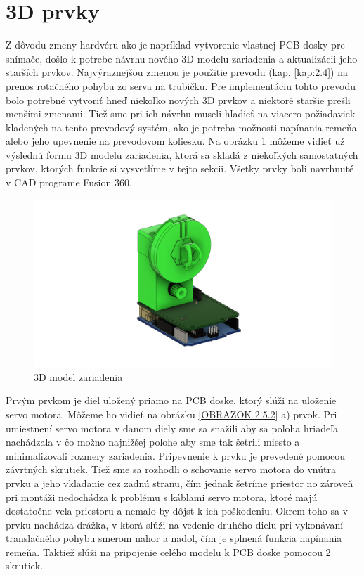 \section{3D prvky}
\label{kap:2.5}


Z dôvodu zmeny hardvéru ako je napríklad vytvorenie vlastnej PCB dosky pre snímače, došlo  k potrebe návrhu nového 3D modelu zariadenia a aktualizácii jeho starších prvkov.  Najvýraznejšou zmenou je použitie prevodu (kap. \ref{kap:2.4}) na prenos rotačného pohybu zo serva na trubičku. Pre implementáciu tohto prevodu bolo potrebné vytvoriť hneď niekoľko nových 3D prvkov a niektoré staršie prešli menšími zmenami. Tiež sme pri ich návrhu museli hľadieť na viacero požiadaviek kladených na tento prevodový systém, ako je potreba možnosti napínania remeňa alebo jeho upevnenie na prevodovom koliesku. Na obrázku \ref{OBRAZOK 2.5.1} môžeme vidieť už výslednú formu 3D modelu zariadenia, ktorá sa skladá z niekoľkých samostatných prvkov, ktorých funkcie si vysvetlíme v tejto sekcii. Všetky prvky boli navrhnuté v CAD programe Fusion 360.
\begin{figure}[!h]
	\centering
	\includegraphics[width=150mm]{obr/3Dmodel.png}
	\caption{3D model zariadenia }\label{OBRAZOK 2.5.1} 
\end{figure} 

Prvým prvkom je diel uložený priamo na PCB doske, ktorý slúži na uloženie servo motora. Môžeme ho vidieť na obrázku \ref{OBRAZOK 2.5.2} a) prvok.  Pri umiestnení servo motora v danom diely sme sa snažili aby sa poloha hriadeľa nachádzala v čo možno najnižšej polohe aby sme tak šetrili miesto a minimalizovali rozmery zariadenia. Pripevnenie k prvku je prevedené pomocou závrtných skrutiek. Tiež sme sa rozhodli o schovanie servo motora do vnútra prvku a jeho vkladanie cez zadnú stranu, čím jednak šetríme priestor no zároveň pri montáži nedochádza k problému s káblami servo motora, ktoré majú dostatočne veľa priestoru a nemalo by dôjsť k ich poškodeniu.  Okrem toho sa v prvku nachádza drážka, v ktorá slúži na vedenie druhého dielu pri vykonávaní translačného pohybu smerom nahor a nadol, čím je splnená funkcia napínania remeňa.  Taktiež slúži na pripojenie celého modelu k PCB doske pomocou 2 skrutiek.

